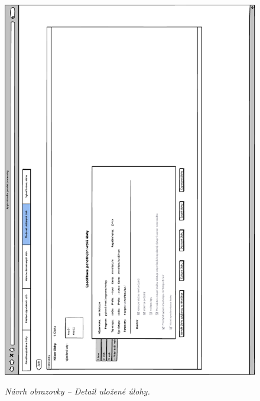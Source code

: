 \begin{figure}[H]
\begin{center}
    \scalebox{0.78}
    {   
        \includegraphics{images/wireframe_appendix_savedTaskDetail.pdf}
    }
    \caption{\label{obr:wireframe_appendix_savedTaskDetail} {\it Návrh obrazovky -- Detail uložené úlohy.}}
\end{center}
\end{figure}
